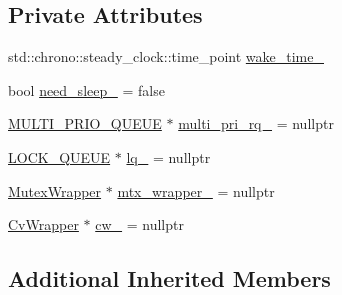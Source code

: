 \subsection*{Private Attributes}
\begin{DoxyCompactItemize}
\item 
std\-::chrono\-::steady\-\_\-clock\-::time\-\_\-point \hyperlink{classapollo_1_1cyber_1_1scheduler_1_1ClassicContext_abc30359d23f986f35b0c01ff81d6ccc1}{wake\-\_\-time\-\_\-}
\item 
bool \hyperlink{classapollo_1_1cyber_1_1scheduler_1_1ClassicContext_a094e0d83afedbb7530649d54b17f9e65}{need\-\_\-sleep\-\_\-} = false
\item 
\hyperlink{namespaceapollo_1_1cyber_1_1scheduler_ac66e3c3cdda21d9be8ea0692401913a2}{M\-U\-L\-T\-I\-\_\-\-P\-R\-I\-O\-\_\-\-Q\-U\-E\-U\-E} $\ast$ \hyperlink{classapollo_1_1cyber_1_1scheduler_1_1ClassicContext_aa3ed67cfe2876f8fd1e1388867cad234}{multi\-\_\-pri\-\_\-rq\-\_\-} = nullptr
\item 
\hyperlink{namespaceapollo_1_1cyber_1_1scheduler_a714aab7bf591e6d2f48fafdbbb1dda02}{L\-O\-C\-K\-\_\-\-Q\-U\-E\-U\-E} $\ast$ \hyperlink{classapollo_1_1cyber_1_1scheduler_1_1ClassicContext_af6e0adf912a3056950ded3660aabb9ec}{lq\-\_\-} = nullptr
\item 
\hyperlink{classapollo_1_1cyber_1_1scheduler_1_1MutexWrapper}{Mutex\-Wrapper} $\ast$ \hyperlink{classapollo_1_1cyber_1_1scheduler_1_1ClassicContext_a12aaac26d8fbeea3ac3124eb08528409}{mtx\-\_\-wrapper\-\_\-} = nullptr
\item 
\hyperlink{classapollo_1_1cyber_1_1scheduler_1_1CvWrapper}{Cv\-Wrapper} $\ast$ \hyperlink{classapollo_1_1cyber_1_1scheduler_1_1ClassicContext_a39f22a14b1997f761659f2fe8cbade8b}{cw\-\_\-} = nullptr
\end{DoxyCompactItemize}
\subsection*{Additional Inherited Members}


